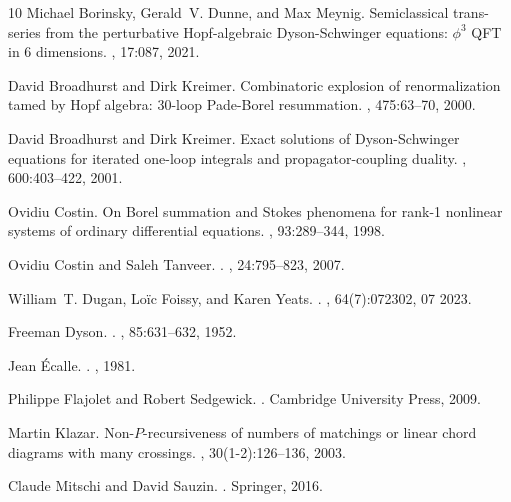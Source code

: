 \documentclass[oneside]{amsart}
\theoremstyle{definition}
\begin{document}
\begin{thebibliography}{10}
Michael Borinsky, Gerald~V. Dunne, and Max Meynig.
\newblock Semiclassical trans-series from the perturbative {H}opf-algebraic
  {D}yson-{S}chwinger equations: $\phi^3$ {QFT} in 6 dimensions.
, 17:087, 2021.

David Broadhurst and Dirk Kreimer.
\newblock Combinatoric explosion of renormalization tamed by {H}opf algebra:
  30-loop {P}ade-{B}orel resummation.
, 475:63--70, 2000.

David Broadhurst and Dirk Kreimer.
\newblock Exact solutions of {D}yson-{S}chwinger equations for iterated
  one-loop integrals and propagator-coupling duality.
, 600:403--422, 2001.

Ovidiu Costin.
\newblock On {B}orel summation and {S}tokes phenomena for rank-1 nonlinear
  systems of ordinary differential equations.
, 93:289--344, 1998.

Ovidiu Costin and Saleh Tanveer.
.
,
  24:795--823, 2007.

William~T. Dugan, Loïc Foissy, and Karen Yeats.
.
, 64(7):072302, 07 2023.

Freeman Dyson.
.
, 85:631--632, 1952.

Jean {\'E}calle.
.
, 1981.

Philippe Flajolet and Robert Sedgewick.
.
\newblock Cambridge University Press, 2009.

Martin Klazar.
\newblock Non-{$P$}-recursiveness of numbers of matchings or linear chord
  diagrams with many crossings.
, 30(1-2):126--136, 2003.

Claude Mitschi and David Sauzin.
.
\newblock Springer, 2016.


\end{thebibliography}
\end{document}
